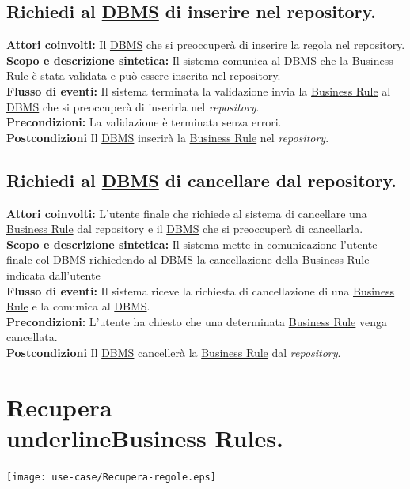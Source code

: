 \subsection{Richiedi al \underline{DBMS} di inserire nel repository.}
\textbf{Attori coinvolti:} Il \underline{DBMS} che si preoccuper\`a di inserire la regola nel repository.\\
\textbf{Scopo e descrizione sintetica:} Il sistema comunica al \underline{DBMS} che la \underline{Business Rule} \`e stata validata e pu\`o essere inserita nel repository.\\
\textbf{Flusso di eventi:} Il sistema  terminata la validazione invia la \underline{Business Rule} al \underline{DBMS} che si preoccuper\`a di inserirla nel \textit{repository}.\\
\textbf{Precondizioni:} La validazione \`e terminata senza errori.\\
\textbf{Postcondizioni} Il \underline{DBMS} inserir\`a la \underline{Business Rule} nel \textit{repository}.

\subsection{Richiedi al \underline{DBMS} di cancellare dal repository.}
\textbf{Attori coinvolti:} L'utente finale che richiede al sistema di cancellare una \underline{Business Rule} dal repository e il \underline{DBMS} che si preoccuper\`a di cancellarla.\\
\textbf{Scopo e descrizione sintetica:} Il sistema mette in comunicazione l'utente finale col \underline{DBMS} richiedendo al \underline{DBMS} la cancellazione della \underline{Business Rule} indicata dall'utente\\
\textbf{Flusso di eventi:} Il sistema riceve la richiesta di cancellazione di una \underline{Business Rule} e la comunica al \underline{DBMS}.\\
\textbf{Precondizioni:} L'utente ha chiesto che una determinata \underline{Business Rule} venga cancellata.\\
\textbf{Postcondizioni} Il \underline{DBMS} canceller\`a la \underline{Business Rule} dal \textit{repository}.


\section{Recupera \\underline{Business Rules}.}
\begin{center}
 \texttt{[image: use-case/Recupera-regole.eps]}\
\end{center}

